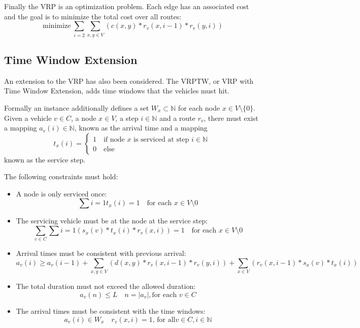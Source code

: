 \documentclass[12pt, letterpaper]{article}
\DeclareMathOperator*{\minimize}{minimize}
\begin{document}
Finally the VRP is an optimization problem. Each edge has an associated cost and the goal is to minimize the total cost over all routes:
$$\displaystyle{\minimize \sum_{i=2}\sum_{x,y \in V} (c(x,y) * r_v(x,i-1) * r_v(y,i))}$$

\subsection{Time Window Extension}
An extension to the VRP has also been considered. The VRPTW, or VRP with Time Window Extension, adds time windows that the vehicles must hit.

Formally an instance additionally defines a set $W_x \subset \mathbb{N}$ for each node $x \in V \setminus \{0\}$.
Given a vehicle $v \in C$, a node $x \in V$, a step $i \in \mathbb{N}$ and a route $r_v$, there must exist a mapping $a_v(i) \in \mathbb{N}$, known as the arrival time and a mapping 
$$t_x(i) = \begin{cases}
			1	\quad \text{if node } x \text{ is serviced at step } i \in \mathbb{N}\\
			0	\quad \text{else}
		\end{cases}$$ 
known as the service step.

The following constraints must hold:
\begin{itemize}
	\item A node is only serviced once:\\
		$$\sum{i=1} t_x(i) = 1 \quad \text{for each } x \in V \setminus {0}$$
	\item The servicing vehicle must be at the node at the service step:\\
		$$\sum_{v \in C} \sum{i=1} (s_x(v) *  t_x(i) * r_v(x,i)) = 1 \quad \text{for each } x \in V \setminus {0}$$
	\item Arrival times must be consistent with previous arrival:\\
		$$a_v(i) \geq a_v(i-1) + \sum_{x,y \in V} (d(x,y) * r_v(x,i-1) * r_v(y,i)) + \sum_{x \in V} (r_v(x, i-1) * s_x(v) * t_x(i))$$
	\item The total duration must not exceed the allowed duration: \\
		$$a_v(n) \leq L \quad n = |a_v|, \text{for each } v \in C$$
	\item The arrival times must be consistent with the time windows:\\
		$$a_v(i) \in W_x \quad r_v(x,i)  = 1 \text{, for all} v \in C, i \in \mathbb{N}$$
\end{itemize}
\end{document}
